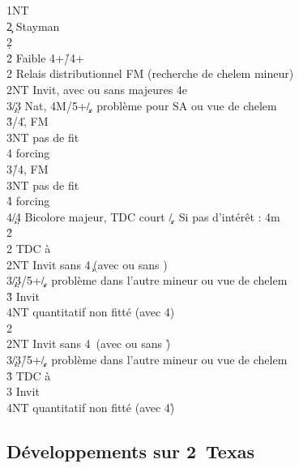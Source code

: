 \documentclass[a4paper]{article}
\begin{document}
\begin{bidtable}
1NT\+\\
2\c \> Stayman\+\\
2\d\+\\
2\h \> Faible 4+\h /4+\s \\
2\s \> Relais distributionnel FM (recherche de chelem mineur)\\
2NT \> Invit, avec ou sans majeures 4e\\
3\c/3\d \> Nat, 4M/5+\c /\d , problème pour SA ou vue de chelem\\
3\h {}\s /4\h , FM\+\\
3NT \> pas de fit\+\\
4\s \> forcing\-\-\\
3\s {}\h /4\s , FM\+\\
3NT \> pas de fit\+\\
4\h \> forcing\-\-\\
4\c/4\d \> Bicolore majeur, TDC court \c /\d . Si pas d'intérêt : 4m\-\\
2\h\+\\
2\s \> TDC à \h \\
2NT \> Invit sans 4\c\ (avec ou sans \s )\\
3\c/3\d {}\s /5+\c /\d , problème dans l'autre mineur ou vue de chelem\\
3\h \> Invit\\
4NT \> quantitatif non fitté (avec 4\s )\-\\
2\s\+\\
2NT \> Invit sans 4\s\ (avec ou sans \h )\\
3\c/3\d {}\h /5+\c /\d , problème dans l'autre mineur ou vue de chelem\\
3\h \> TDC à \s \\
3\s \> Invit\\
4NT \> quantitatif non fitté (avec 4\h )\-\-\-
\end{bidtable}

\subsection{Développements sur 2\pdfs\ Texas \pdfc}
\end{document}
